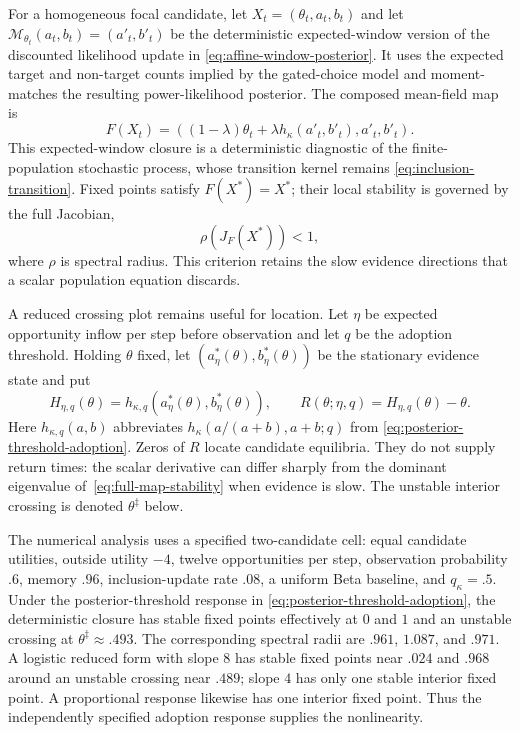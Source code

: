 For a homogeneous focal candidate, let
$X_t=(\theta_t,a_t,b_t)$ and let
$\mathcal M_{\theta_t}(a_t,b_t)=(a'_t,b'_t)$ be the deterministic
expected-window version of the discounted likelihood update in
\eqref{eq:affine-window-posterior}. It uses the expected target and non-target
counts implied by the gated-choice model and moment-matches the resulting
power-likelihood posterior. The composed mean-field map is
\begin{equation}
F(X_t)=\left(
(1-\lambda)\theta_t+\lambda h_\kappa(a'_t,b'_t),
a'_t,b'_t\right).
\label{eq:full-mean-field-map}
\end{equation}
This expected-window closure is a deterministic diagnostic of the
finite-population stochastic process, whose transition kernel remains
\eqref{eq:inclusion-transition}. Fixed points satisfy
$F(X^\ast)=X^\ast$; their local stability is governed by the full Jacobian,
\begin{equation}
\rho\!\left(J_F(X^\ast)\right)<1,
\label{eq:full-map-stability}
\end{equation}
where $\rho$ is spectral radius. This criterion retains the slow evidence
directions that a scalar population equation discards.

A reduced crossing plot remains useful for location. Let $\eta$ be expected
opportunity inflow per step before observation and let $q$ be the adoption
threshold. Holding $\theta$ fixed, let
$(a^\ast_{\eta}(\theta),b^\ast_{\eta}(\theta))$ be the stationary evidence state
and put
\[
H_{\eta,q}(\theta)=
h_{\kappa,q}(a^\ast_{\eta}(\theta),b^\ast_{\eta}(\theta)),
\qquad
R(\theta;\eta,q)=H_{\eta,q}(\theta)-\theta.
\]
Here $h_{\kappa,q}(a,b)$ abbreviates
$h_\kappa(a/(a+b),a+b;q)$ from
\eqref{eq:posterior-threshold-adoption}.
Zeros of $R$ locate candidate equilibria. They do
not supply return times: the scalar derivative can differ sharply from the
dominant eigenvalue of~\eqref{eq:full-map-stability} when evidence is slow.
The unstable interior crossing is denoted $\theta^\ddagger$ below.

The numerical analysis uses a specified two-candidate cell: equal candidate
utilities, outside utility $-4$, twelve opportunities per step, observation
probability $.6$, memory $.96$, inclusion-update rate $.08$, a uniform Beta
baseline, and $q_\kappa=.5$. Under the posterior-threshold response in
\eqref{eq:posterior-threshold-adoption}, the deterministic closure has stable
fixed points effectively at $0$ and $1$ and an unstable crossing at
$\theta^\ddagger\approx .493$. The corresponding spectral radii are $.961$,
$1.087$, and $.971$. A logistic reduced form with slope $8$ has stable fixed
points near $.024$ and $.968$ around an unstable crossing near $.489$; slope
$4$ has only one stable interior fixed point. A proportional response likewise
has one interior fixed point. Thus the independently specified adoption response
supplies the nonlinearity.

